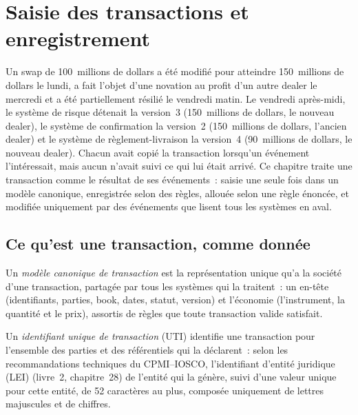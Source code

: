 \chapter{Saisie des transactions et enregistrement}\label{ch:pl:trade-capture-and-booking}

Un swap de 100~millions de dollars a été modifié pour atteindre 150~millions de dollars le lundi, a fait l'objet d'une novation au profit d'un autre dealer le mercredi et a été partiellement résilié le vendredi
matin. Le vendredi après-midi, le système de risque détenait la version~3 (150~millions de dollars, le nouveau dealer), le système de confirmation la version~2 (150~millions de dollars,
l'ancien dealer) et le système de règlement-livraison la version~4 (90~millions de dollars, le nouveau dealer). Chacun avait copié la transaction lorsqu'un événement l'intéressait,
mais aucun n'avait suivi ce qui lui était arrivé. Ce chapitre traite une transaction comme le résultat de ses événements~: saisie une seule fois
dans un modèle canonique, enregistrée selon des règles, allouée selon une règle énoncée, et modifiée uniquement par des événements que lisent tous les systèmes en aval.

\section{Ce qu'est une transaction, comme donnée}

\begin{definition}\label{def:pl:trade-capture-and-booking:canonical}
Un \emph{modèle canonique de transaction} est la représentation unique qu'a la société d'une transaction, partagée par tous les systèmes qui
la traitent~: un en-tête (identifiants, parties, book, dates, statut, version) et l'économie (l'instrument, la quantité et le prix),
assortis de règles que toute transaction valide satisfait.
\end{definition}

\begin{definition}\label{def:pl:trade-capture-and-booking:uti}
Un \emph{identifiant unique de transaction} (UTI) identifie une transaction pour l'ensemble des parties et
des référentiels qui la déclarent~: selon les recommandations techniques du CPMI--IOSCO, l'identifiant d'entité juridique (LEI) (livre~2, chapitre~28) de l'entité qui
la génère, suivi d'une valeur unique pour cette entité, de 52 caractères au plus, composée uniquement de lettres majuscules et de chiffres.
\end{definition}

